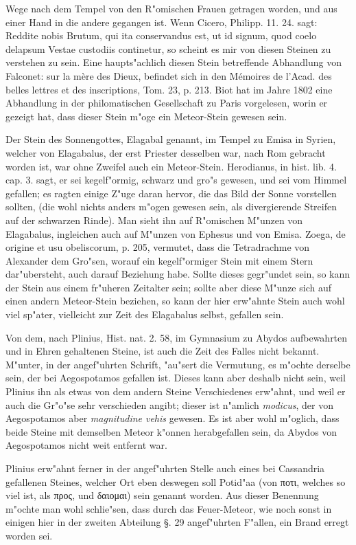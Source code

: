 \documentclass[a4paper, 11pt, oneside, polutonikogreek, german]{article}
\begin{document}
Wege nach dem Tempel von den R"omischen Frauen getragen worden, und aus einer Hand in die andere gegangen ist. Wenn Cicero, Philipp. 11. 24. sagt: Reddite nobis Brutum, qui ita conservandus est, ut id signum, quod coelo delapsum Vestae custodiis continetur, so scheint es mir von diesen Steinen zu verstehen zu sein. Eine haupts"achlich diesen Stein betreffende Abhandlung von Falconet: sur la mère des Dieux, befindet sich in den Mémoires de l'Acad. des belles lettres et des inscriptions, Tom. 23, p. 213. Biot hat im Jahre 1802 eine Abhandlung in der philomatischen Gesellschaft zu Paris vorgelesen, worin er gezeigt hat, dass dieser Stein m"oge ein Meteor-Stein gewesen sein.

Der Stein des Sonnengottes, Elagabal genannt, im Tempel zu Emisa in Syrien, welcher von Elagabalus, der erst Priester desselben war, nach Rom gebracht worden ist, war ohne Zweifel auch ein Meteor-Stein. Herodianus, in hist. lib. 4. cap. 3. sagt, er sei kegelf"ormig, schwarz und gro"s gewesen, und sei vom Himmel gefallen; es ragten einige Z"uge daran hervor, die das Bild der Sonne vorstellen sollten, (die wohl nichts anders m"ogen gewesen sein, als divergierende Streifen auf der schwarzen Rinde). Man sieht ihn auf R"omischen M"unzen von Elagabalus, ingleichen auch auf M"unzen von Ephesus und von Emisa. Zoega, de origine et usu obeliscorum, p. 205, vermutet, dass die Tetradrachme von Alexander dem Gro"sen, worauf ein kegelf"ormiger Stein mit einem Stern dar"ubersteht, auch darauf Beziehung habe. Sollte dieses gegr"undet sein, so kann der Stein aus einem fr"uheren Zeitalter sein; sollte aber diese M"unze sich auf einen andern Meteor-Stein beziehen, so kann der hier erw"ahnte Stein auch wohl viel sp"ater, vielleicht zur Zeit des Elagabalus selbst, gefallen sein.

Von dem, nach Plinius, Hist. nat. 2. 58, im Gymnasium zu Abydos aufbewahrten und in Ehren gehaltenen Steine, ist auch die Zeit des Falles nicht bekannt. M"unter, in der angef"uhrten Schrift, "au"sert die Vermutung, es m"ochte derselbe sein, der bei Aegospotamos gefallen ist. Dieses kann aber deshalb nicht sein, weil Plinius ihn als etwas von dem andern Steine Verschiedenes erw"ahnt, und weil er auch die Gr"o"se sehr verschieden angibt; dieser ist n"amlich \emph{modicus}, der von Aegospotamos aber \emph{magnitudine vehis} gewesen. Es ist aber wohl m"oglich, dass beide Steine mit demselben Meteor k"onnen herabgefallen sein, da Abydos von Aegospotamos nicht weit entfernt war.

Plinius erw"ahnt ferner in der angef"uhrten Stelle auch eines bei Cassandria gefallenen Steines, welcher Ort eben deswegen soll Potid"aa (von ποτι, welches so viel ist, als προς, und δαιομαι) sein genannt worden. Aus dieser Benennung m"ochte man wohl schlie"sen, dass durch das Feuer-Meteor, wie noch sonst in einigen hier in der zweiten Abteilung §. 29 angef"uhrten F"allen, ein Brand erregt worden sei.
\end{document}
